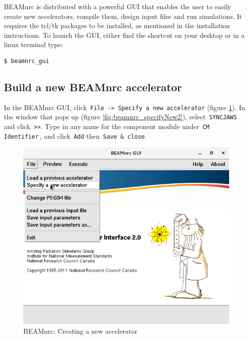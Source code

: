 \documentclass[12pt,twoside]{article}
\begin{document}
BEAMnrc is distributed with a powerful GUI that enables the user to easily create new accelerators, compile them, design input files and run simulations. It requires the tcl/tk packages to be installed, as mentioned in the installation instructions. To launch the GUI, either find the shortcut on your desktop or in a linux terminal type:

\begin{lstlisting}
$ beamnrc_gui
\end{lstlisting}

\subsection{Build a new BEAMnrc accelerator}
In the BEAMnrc GUI, click \,\Verb|File -> Specify a new accelerator| (figure \ref{fig:beamnrc_specifyNew}). In the window that pops up (figure \ref{fig:beamnrc_specifyNew2}), select \,\Verb|SYNCJAWS|\, and click \,\Verb|>>|. Type in any name for the component module under \,\Verb|CM Identifier|\,, and click \,\Verb|Add| then \,\Verb|Save & close|.

\begin{figure}
\begin{center}
\includegraphics[width=5in]{figures/beamnrc_specifyNew}
\caption{BEAMnrc: Creating a new accelerator}
\label{fig:beamnrc_specifyNew}
\end{center}
\end{figure}
\end{document}
